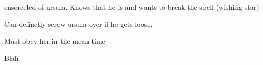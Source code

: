 \documentclass[char]{NeptuneBall}
\begin{document}
\name{\cPrince{}}

ensorceled of ursula. Knows that he is and wants to break the spell (wishing star)

Can definetly screw ursula over if he gets loose.

Must obey her in the mean time


\begin{itemz}[Goals]
  \item Blah
\end{itemz}

\begin{contacts}
  \contact{}
\end{contacts}
\end{document}
